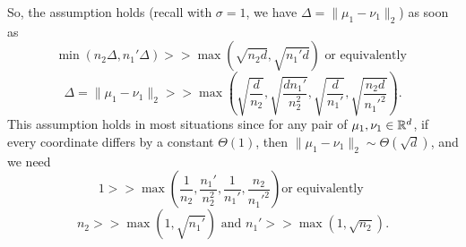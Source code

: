 \begin{remark}
\[   \]
   So, the assumption holds (recall with $\sigma= 1$, we have $\Delta= \|\mu_1- \nu_1\|_2$) as soon as
   \[
   \min(n_2\Delta, n_1'\Delta) >> \max( \sqrt{n_2d}, \sqrt{n_1'd})  \text{ or equivalently }
   \]
   \[
   \Delta = \|\mu_1- \nu_1\|_2
   >>
   \max
   \left(\sqrt{\frac{d}{n_2}}, \sqrt{\frac{dn_1'}{n_2^2}}, \sqrt{\frac{d}{n_1'}}, \sqrt{\frac{n_2 d}{n_1'^2}} \right).
   \]
   This assumption holds in most situations since for any pair of $\mu_1, \nu_1 \in \mathbb{R}^d$, if every coordinate differs by a constant $\Theta(1)$, then $\|\mu_1- \nu_1\|_2 \sim \Theta(\sqrt{d})$, and we need
   \[
   1 >> \max
   \left(\frac{1}{n_2}, \frac{n_1'}{n_2^2}, \frac{1}{n_1'}, \frac{n_2}{n_1'^2} \right) \text{or equivalently }
   \]
   \[
   n_2 >> \max(1, \sqrt{n_1'}) \text{ and }
   n_1' >> \max(1, \sqrt{n_2}).
   \]
\end{remark}
